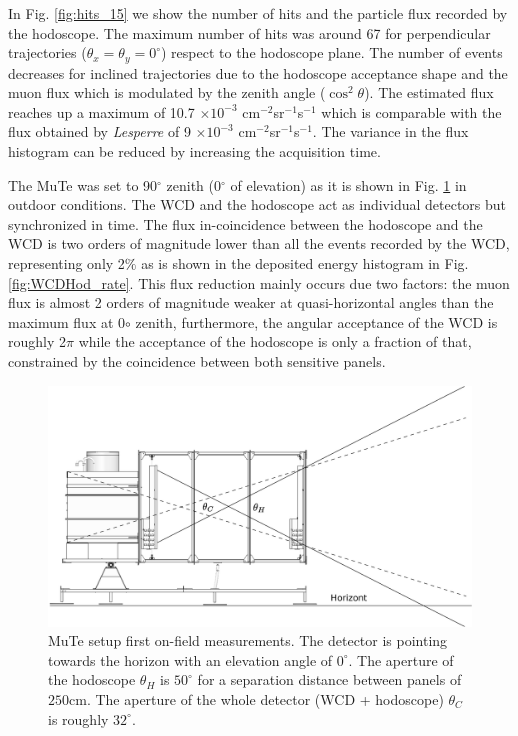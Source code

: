 \documentclass[letterpaper,11pt]{article}
\begin{document}
In Fig. \ref{fig:hits_15} we show the number of hits and the particle flux recorded by the hodoscope. The maximum number of hits was around 67 for perpendicular trajectories ($\theta_x=\theta_y=0^{\circ}$) respect to the hodoscope plane. The number of events decreases for inclined trajectories due to the hodoscope acceptance shape and the muon flux which is modulated by the zenith angle ($\cos^2 \theta$). The estimated flux reaches up a maximum of 10.7 $\times 10^{-3}$ cm$^{-2}$sr$^{-1}$s$^{-1}$ which is comparable with the flux obtained by \textit{Lesperre} \cite{Lesparre2012} of 9 $\times 10^{-3}$ cm$^{-2}$sr$^{-1}$s$^{-1}$. The variance in the flux histogram can be reduced by increasing the acquisition time.

The MuTe was set to 90$^{\circ}$ zenith (0$^{\circ}$ of elevation) as it is shown in Fig. \ref{fig:WCDHod} in outdoor conditions. The WCD and the hodoscope act as individual detectors but synchronized in time. The flux in-coincidence between the hodoscope and the WCD is two orders of magnitude lower than all the events recorded by the WCD, representing only 2$\%$ as is shown in the deposited energy histogram in Fig. \ref{fig:WCDHod_rate}. This flux reduction mainly occurs due two factors: the muon flux is almost 2 orders of magnitude weaker at quasi-horizontal angles than the maximum flux at 0${\circ}$ zenith, furthermore, the angular acceptance of the WCD is roughly 2$\pi$ while the acceptance of the hodoscope is only a fraction of that, constrained by the coincidence between both sensitive panels.

\begin{figure}[htb]
\centering
\includegraphics[width=0.7\columnwidth]{Figures/Acceptance.eps}
\caption{MuTe setup first on-field measurements. The detector is pointing towards the horizon with an elevation angle of $0^{\circ}$. The aperture of the hodoscope $\theta_H$ is $50^{\circ}$ for a separation distance between panels of $250$cm. The aperture of the whole detector (WCD + hodoscope) $\theta_C$ is roughly $32^{\circ}$.}
\label{fig:WCDHod}
\end{figure}
\end{document}
